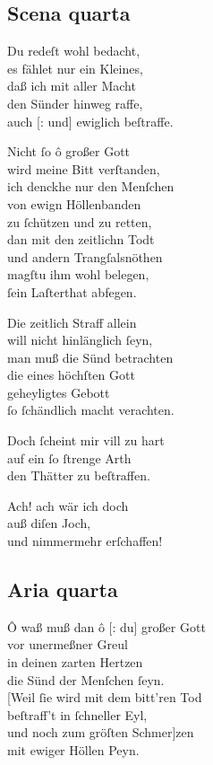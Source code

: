 \documentclass{ees}
\newenvironment{lyrics}[1]{%
  \subsection{#1}\nopagebreak%
  \begin{lyricslist}%
  \let\voice\item%
}{%
  \end{lyricslist}%
}
\begin{document}
\begin{lyrics}{Scena quarta}
  \voice[Schöpffer]
  Du redeſt wohl bedacht,\\
  es fählet nur ein Kleines,\\
  daß ich mit aller Macht\\
  den Sünder hinweg raffe,\\
  auch [: und] ewiglich beſtraffe.

  \voice[Barmh.]
  Nicht ſo ô großer Gott\\
  wird meine Bitt verſtanden,\\
  ich denckhe nur den Menſchen\\
  von ewign Höllenbanden\\
  zu ſchützen und zu retten,\\
  dan mit den zeitlichn Todt\\
  und andern Trangſalsnöthen\\
  magſtu ihm wohl belegen,\\
  ſein Laſterthat abfegen.

  \voice[Gerecht.]
  Die zeitlich Straff allein\\
  will nicht hinlänglich ſeyn,\\
  man muß die Sünd betrachten\\
  die eines höchſten Gott\\
  geheyligtes Gebott\\
  ſo ſchändlich macht verachten.

  \voice[Barmh.]
  Doch ſcheint mir vill zu hart\\
  auf ein ſo ſtrenge Arth\\
  den Thätter zu beſtraffen.

  \voice[Adam]
  Ach! ach wär ich doch\\
  auß diſen Joch,\\
  und nimmermehr erſchaffen!
\end{lyrics}

\clearpage
\begin{lyrics}{Aria quarta}
  \voice[Adam]
  Ô waß muß dan ô [: du] großer Gott\\
  vor unermeßner Greul\\
  in deinen zarten Hertzen\\
  die Sünd der Menſchen ſeyn.\\[1ex]
  [Weil ſie wird mit dem bitt’ren Tod\\
  beſtraff’t in ſchneller Eyl,\\
  und noch zum gröſten Schmer]zen\\
  mit ewiger Höllen Peyn.
\end{lyrics}
\end{document}
